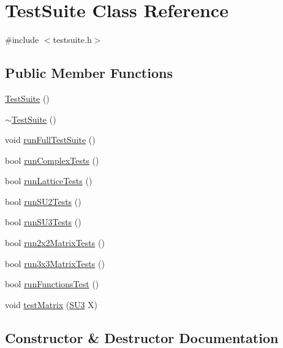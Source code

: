 \hypertarget{class_test_suite}{}\section{Test\+Suite Class Reference}
\label{class_test_suite}


{\ttfamily \#include $<$testsuite.\+h$>$}

\subsection*{Public Member Functions}
\begin{DoxyCompactItemize}
\item 
\mbox{\hyperlink{class_test_suite_af7291e6d8b53443604ee0c1fcf1fadfc}{Test\+Suite}} ()
\item 
\mbox{\hyperlink{class_test_suite_a1a4603e985169c62d251876dd3910b5e}{$\sim$\+Test\+Suite}} ()
\item 
void \mbox{\hyperlink{class_test_suite_a0fa7e788a1b1c235faa475c0d1aaa1e3}{run\+Full\+Test\+Suite}} ()
\item 
bool \mbox{\hyperlink{class_test_suite_a0597dcd7c68390ac33d8095f2a76ae0f}{run\+Complex\+Tests}} ()
\item 
bool \mbox{\hyperlink{class_test_suite_aa24e7ab393007d18d027fe95c5a3ec58}{run\+Lattice\+Tests}} ()
\item 
bool \mbox{\hyperlink{class_test_suite_a904ac34cad4166c281f7dbce9a682b2c}{run\+S\+U2\+Tests}} ()
\item 
bool \mbox{\hyperlink{class_test_suite_a7e884438760a81f7f4da7831043f88b0}{run\+S\+U3\+Tests}} ()
\item 
bool \mbox{\hyperlink{class_test_suite_acf6d1ad1920132a4aed74457bb2df8cb}{run2x2\+Matrix\+Tests}} ()
\item 
bool \mbox{\hyperlink{class_test_suite_a91444c36a86d453cc9922d888b248a6b}{run3x3\+Matrix\+Tests}} ()
\item 
bool \mbox{\hyperlink{class_test_suite_af257c555a7fff6934523f80b9c59309c}{run\+Functions\+Test}} ()
\item 
void \mbox{\hyperlink{class_test_suite_ab5f5915eeeca7674592c8f170948f43d}{test\+Matrix}} (\mbox{\hyperlink{class_s_u3}{S\+U3}} X)
\end{DoxyCompactItemize}


\subsection{Constructor \& Destructor Documentation}
\mbox{\label{class_test_suite_af7291e6d8b53443604ee0c1fcf1fadfc}} 
